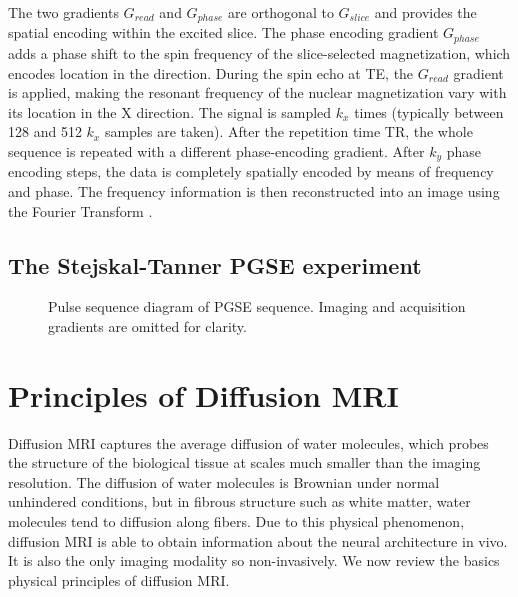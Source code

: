 The two gradients $G_{read}$ and $G_{phase}$ are orthogonal to $G_{slice}$ and provides the spatial encoding within the excited slice. The phase encoding gradient $G_{phase}$ adds a phase shift to the spin frequency of the slice-selected magnetization, which encodes location in the  direction. During the spin echo at TE, the $G_{read}$ gradient is applied, making the resonant frequency of the nuclear magnetization vary with its location in the X direction. The signal is sampled $k_x$ times (typically between 128 and 512 $k_x$ samples are taken).
After the repetition time TR, the whole sequence is repeated with a different phase-encoding gradient. After $k_y$ phase encoding steps, the data is completely spatially encoded by means of frequency and phase. The frequency information is then reconstructed into an image using the Fourier Transform \cite{Liang:2000}.

\subsection*{The Stejskal-Tanner PGSE experiment}
\begin{figure}[ht]
\centering
{}
\caption{Pulse sequence diagram of PGSE sequence. Imaging and acquisition gradients are omitted for clarity.}
\label{fig:chapter2 pgse_diagram}
\end{figure}


\section{Principles of Diffusion MRI}
Diffusion MRI captures the average diffusion of water molecules, which probes the structure of the biological tissue at scales much smaller than the imaging resolution. The diffusion of water molecules is Brownian under normal unhindered conditions, but in fibrous structure such as white matter, water molecules tend to diffusion along fibers. Due to this physical phenomenon, diffusion MRI is able to obtain information about the neural architecture in vivo. It is also the only imaging modality so non-invasively. We now review the basics physical principles of diffusion MRI.

